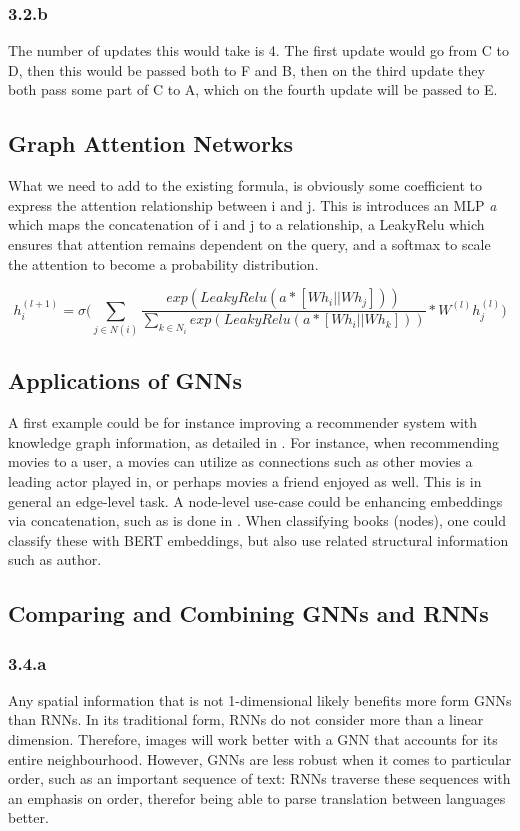 \subsubsection*{3.2.b}
The number of updates this would take is 4. The first update would go from C to D, then this
would be passed both to F and B, then on the third update they both pass some part of C to A, which
on the fourth update will be passed to E.

\subsection{Graph Attention Networks}
What we need to add to the existing formula, is obviously some coefficient to express the attention
relationship between i and j. This is introduces an MLP \emph{a} which maps the concatenation of i and
j to a relationship, a LeakyRelu which ensures that attention remains dependent on the query, and a
softmax to scale the attention to become a probability distribution. 

$$
    h_i^{(l+1)} = \sigma \Big(
        \sum_{j \in N(i)} \frac{exp(LeakyRelu(a * [Wh_i || Wh_j]))}{\sum_{k \in N_i} exp(LeakyRelu(a * [Wh_i || Wh_k]))} * W^{(l)} h_j^{(l)}
    \Big )
$$

\subsection{Applications of GNNs}
A first example could be for instance improving a recommender system with knowledge graph information,
as detailed in \cite{guo2020survey}. For instance, when recommending movies to a user, a movies can utilize
as connections such as other movies a leading actor played in, or perhaps movies a friend enjoyed as well. 
This is in general an edge-level task.
A node-level use-case could be enhancing embeddings via concatenation, such as is done 
in \cite{DBLP:journals/corr/abs-1909-08402}. When classifying books (nodes), one could classify these
with BERT embeddings, but also use related structural information such as author.

\subsection{Comparing and Combining GNNs and RNNs}

\subsubsection*{3.4.a}
Any spatial information that is not 1-dimensional likely benefits more form GNNs than RNNs. In 
its traditional form, RNNs do not consider more than a linear dimension. Therefore, images will work 
better with a GNN that accounts for its entire neighbourhood. However, GNNs are less robust when
it comes to particular order, such as an important sequence of text: RNNs traverse these sequences
with an emphasis on order, therefor being able to parse translation between languages better.

